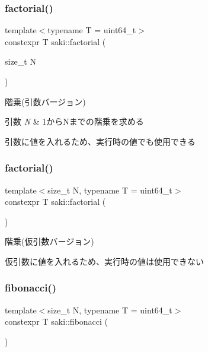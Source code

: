 \subsubsection{\texorpdfstring{factorial()}{factorial()}\hspace{0.1cm}{\footnotesize\ttfamily [1/2]}}
{\footnotesize\ttfamily template$<$typename T  = uint64\+\_\+t$>$ \\
constexpr T saki\+::factorial (\begin{DoxyParamCaption}\item[{size\+\_\+t}]{N }\end{DoxyParamCaption})}



階乗(引数バージョン) 


\begin{DoxyParams}{引数}
{\em N} & 1から\+Nまでの階乗を求める\\
\hline
\end{DoxyParams}
引数に値を入れるため、実行時の値でも使用できる \mbox{\label{namespacesaki_a9dead910b791cee99cf82d1bd2a5d90c}} 
\subsubsection{\texorpdfstring{factorial()}{factorial()}\hspace{0.1cm}{\footnotesize\ttfamily [2/2]}}
{\footnotesize\ttfamily template$<$size\+\_\+t N, typename T  = uint64\+\_\+t$>$ \\
constexpr T saki\+::factorial (\begin{DoxyParamCaption}{ }\end{DoxyParamCaption})}



階乗(仮引数バージョン) 

仮引数に値を入れるため、実行時の値は使用できない \mbox{\label{namespacesaki_a7bbb434ee3c6d77eeb32b85bb9e316f0}} 
\subsubsection{\texorpdfstring{fibonacci()}{fibonacci()}\hspace{0.1cm}{\footnotesize\ttfamily [1/2]}}
{\footnotesize\ttfamily template$<$size\+\_\+t N, typename T  = uint64\+\_\+t$>$ \\
constexpr T saki\+::fibonacci (\begin{DoxyParamCaption}{ }\end{DoxyParamCaption})}



